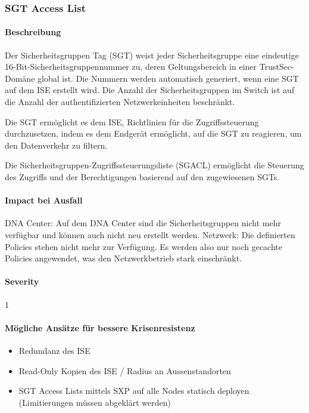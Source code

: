 \subsubsection{SGT Access List}
\paragraph{Beschreibung}
Der Sicherheitsgruppen Tag (SGT) weist jeder Sicherheitsgruppe eine eindeutige 16-Bit-Sicherheitsgruppennummer zu, deren Geltungsbereich in einer TrustSec-Domäne global ist. Die Nummern werden automatisch generiert, wenn eine SGT auf dem ISE erstellt wird. Die Anzahl der Sicherheitsgruppen im Switch ist auf die Anzahl der authentifizierten Netzwerkeinheiten beschränkt.

Die SGT ermöglicht es dem ISE, Richtlinien für die Zugriffssteuerung durchzusetzen, indem es dem Endgerät ermöglicht, auf die SGT zu reagieren, um den Datenverkehr zu filtern.

Die Sicherheitsgruppen-Zugriffssteuerungsliste (SGACL) ermöglicht die Steuerung des Zugriffs und der Berechtigungen basierend auf den zugewiesenen SGTs.

\paragraph{Impact bei Ausfall}
DNA Center: Auf dem DNA Center sind die Sicherheitsgruppen nicht mehr verfügbar und können auch nicht neu erstellt werden.
Netzwerk: Die definierten Policies stehen nicht mehr zur Verfügung. Es werden also nur noch gecachte Policies angewendet, was den Netzwerkbetrieb stark einschränkt. 

\paragraph{Severity} 1

\paragraph{Mögliche Ansätze für bessere Krisenresistenz}
\begin{itemize}
	\item Redundanz des ISE
	\item Read-Only Kopien des ISE / Radius an Aussenstandorten
	\item SGT Access Lists mittels SXP auf alle Nodes statisch deployen (Limitierungen müssen abgeklärt werden)
\end{itemize}

